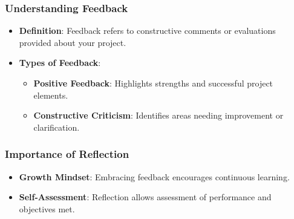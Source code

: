 \documentclass{beamer}
\begin{document}
\begin{frame}[fragile]
    \frametitle{Understanding Feedback}
    \begin{itemize}
        \item \textbf{Definition}: Feedback refers to constructive comments or evaluations provided about your project.
        \item \textbf{Types of Feedback}:
            \begin{itemize}
                \item \textbf{Positive Feedback}: Highlights strengths and successful project elements.
                \item \textbf{Constructive Criticism}: Identifies areas needing improvement or clarification.
            \end{itemize}
    \end{itemize}
\end{frame}

\begin{frame}[fragile]
    \frametitle{Importance of Reflection}
    \begin{itemize}
        \item \textbf{Growth Mindset}: Embracing feedback encourages continuous learning.
        \item \textbf{Self-Assessment}: Reflection allows assessment of performance and objectives met.
    \end{itemize}
\end{frame}
\end{document}
